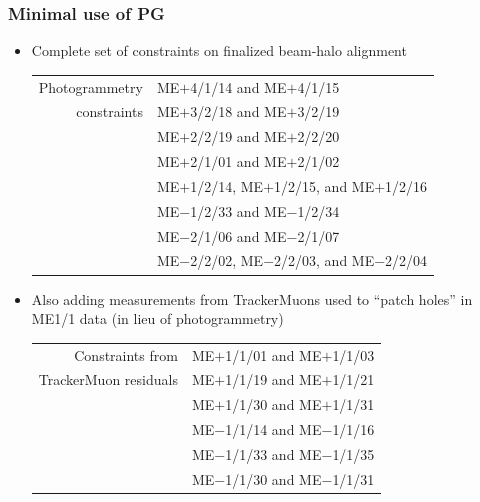 \documentclass[compress]{beamer}
\begin{document}
\begin{frame}
\frametitle{Minimal use of PG}

\begin{itemize}
\item Complete set of constraints on finalized beam-halo alignment

{\scriptsize
\begin{tabular}{r l}
Photogrammetry & ME$+$4/1/14 and ME$+$4/1/15 \\
constraints & ME$+$3/2/18 and ME$+$3/2/19 \\
& ME$+$2/2/19 and ME$+$2/2/20 \\
& ME$+$2/1/01 and ME$+$2/1/02 \\
& ME$+$1/2/14, ME$+$1/2/15, and ME$+$1/2/16 \\
& ME$-$1/2/33 and ME$-$1/2/34 \\
& ME$-$2/1/06 and ME$-$2/1/07 \\
& ME$-$2/2/02, ME$-$2/2/03, and ME$-$2/2/04
\end{tabular}}

\item Also adding measurements from TrackerMuons used to ``patch
  holes'' in ME1/1 data (in lieu of photogrammetry)

{\scriptsize
\begin{tabular}{r l}
Constraints from & ME$+$1/1/01 and ME$+$1/1/03 \\
TrackerMuon residuals & ME$+$1/1/19 and ME$+$1/1/21 \\
& ME$+$1/1/30 and ME$+$1/1/31 \\
& ME$-$1/1/14 and ME$-$1/1/16 \\
& ME$-$1/1/33 and ME$-$1/1/35 \\
& ME$-$1/1/30 and ME$-$1/1/31 \\
\end{tabular}}

\end{itemize}
\end{frame}
\end{document}
